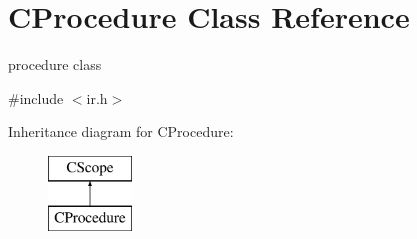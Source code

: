 \hypertarget{classCProcedure}{\section{C\-Procedure Class Reference}
\label{classCProcedure}
}


procedure class  




{\ttfamily \#include $<$ir.\-h$>$}

Inheritance diagram for C\-Procedure\-:\begin{figure}[H]
\begin{center}
\leavevmode
\includegraphics[height=2.000000cm]{classCProcedure}
\end{center}
\end{figure}
